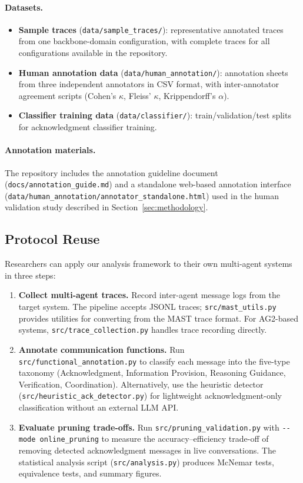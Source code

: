 \paragraph{Datasets.}
\begin{itemize}[nosep]
  \item \textbf{Sample traces} (\texttt{data/sample\_traces/}): representative annotated traces from one backbone-domain configuration, with complete traces for all configurations available in the repository.
  \item \textbf{Human annotation data} (\texttt{data/human\_annotation/}): annotation sheets from three independent annotators in CSV format, with inter-annotator agreement scripts (Cohen's $\kappa$, Fleiss' $\kappa$, Krippendorff's $\alpha$).
  \item \textbf{Classifier training data} (\texttt{data/classifier/}): train/validation/test splits for acknowledgment classifier training.
\end{itemize}

\paragraph{Annotation materials.}
The repository includes the annotation guideline document (\texttt{docs/annotation\_guide.md}) and a standalone web-based annotation interface (\texttt{data/human\_annotation/annotator\_standalone.html}) used in the human validation study described in Section~\ref{sec:methodology}.

\subsection{Protocol Reuse}

Researchers can apply our analysis framework to their own multi-agent systems in three steps:

\begin{enumerate}[nosep]
  \item \textbf{Collect multi-agent traces.} Record inter-agent message logs from the target system. The pipeline accepts JSONL traces; \texttt{src/mast\_utils.py} provides utilities for converting from the MAST trace format. For AG2-based systems, \texttt{src/trace\_collection.py} handles trace recording directly.
  \item \textbf{Annotate communication functions.} Run \texttt{src/functional\_annotation.py} to classify each message into the five-type taxonomy (Acknowledgment, Information Provision, Reasoning Guidance, Verification, Coordination). Alternatively, use the heuristic detector (\texttt{src/heuristic\_ack\_detector.py}) for lightweight acknowledgment-only classification without an external LLM API.
  \item \textbf{Evaluate pruning trade-offs.} Run \texttt{src/pruning\_validation.py} with \texttt{-{}-mode online\_pruning} to measure the accuracy--efficiency trade-off of removing detected acknowledgment messages in live conversations. The statistical analysis script (\texttt{src/analysis.py}) produces McNemar tests, equivalence tests, and summary figures.
\end{enumerate}

